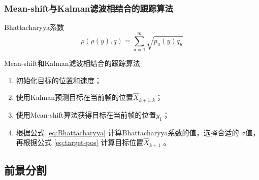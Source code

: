 \documentclass[xcolor=svgnames,serif,table,10pt]{beamer}
\begin{document}
\begin{frame}
  \frametitle{Mean-shift与Kalman滤波相结合的跟踪算法}
  \begin{block}{Bhattacharyya系数}
    \begin{equation}
      \label{eq:Bhattacharyya}
      \rho(\rho(y),q)=\sum_{u=1}^{m}\sqrt{p_{u}(y)q_{u}}
    \end{equation}
  \end{block}

  \pause
  \begin{exampleblock}{Mean-shift和Kalman滤波相结合的跟踪算法}
  \begin{enumerate}[(S1)]
  \item 初始化目标的位置和速度；
  \item 使用Kalman预测目标在当前帧的位置$\hat{X}_{k+1,k}$；
  \item 使用Mean-shift算法获得目标在当前帧的位置$y_1$；
  \item 根据公式 \ref{eq:Bhattacharyya} 计算Bhattacharyya系数的值，选择合适的
    $\sigma$值，再根据公式 \ref{eq:target-pos} 计算目标位置$\hat{X}_{k+1}$ 。
  \end{enumerate}
\end{exampleblock}
  
\end{frame}

\subsection{前景分割}
\end{document}
